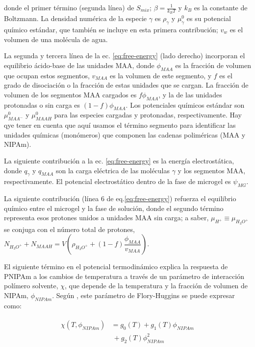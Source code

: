 \noindent donde el primer t\'ermino (segunda l\'inea) de $S_{mix}$; $\beta=\frac{1}{k_BT}$ y $k_B$ es la constante de Boltzmann.
La densidad num\'erica de la especie $\gamma$ es $\rho_\gamma$ y $\mu^0_\gamma$ es su potencial qu\'imico est\'andar, que tambi\'en se incluye en esta primera contribución; $v_w$ es el volumen de una mol\'ecula de agua.


La segunda y tercera l\'inea de la ec. \ref{eq:free-energy} (lado derecho) incorporan el equilibrio \'acido-base de las unidades MAA, donde $\phi_{MAA}$ es la fracci\'on de volumen que ocupan estos segmentos, $v_{MAA}$ es la volumen de este segmento, y $f$ es el grado de disociaci\'on o la fracci\'on de estas unidades que se cargan.
La fracci\'on de volumen de los segmentos MAA cargados es $f\phi_{MAA}$, y la de las unidades protonadas o sin carga es $(1-f)\phi_{MAA}$.
Los potenciales qu\'imicos est\'andar son $\mu^0_{MAA^-}$ y $\mu^0_{MAAH}$ para las especies cargadas y protonadas, respectivamente.
Hay qye tener en cuenta que aqu\'i usamos el t\'ermino segmento para identificar las unidades qu\'imicas (monómeros) que componen las cadenas polim\'ericas (MAA y NIPAm).


La siguiente contribuci\'on a la ec. \ref{eq:free-energy} es la energ\'ia electrost\'atica, donde $q_\gamma$ y $q_{MAA}$ son la carga el\'ectrica de las moléculas $\gamma$ y los segmentos MAA, respectivamente.
El potencial electrost\'atico dentro de la fase de microgel es $\psi_{MG}$.


La siguiente contribución (l\'inea 6 de eq.\ref{eq:free-energy}) refuerza el equilibrio qu\'imico entre el microgel y la fase de soluci\'on, donde el segundo t\'ermino representa esos protones unidos a unidades MAA sin carga;
a saber, $\mu_{H^+}\equiv\mu_{H_3O^+}$ se conjuga con el n\'umero total de protones,
$N_{H_3O^+}+N_{MAAH}=V\left(\rho_{H_3O^+}+(1-f)\dfrac{\phi_{MAA}}{v_{MAA}}\right)$.


El siguiente t\'ermino en el potencial termodin\'amico explica la respuesta de PNIPAm a los cambios de temperatura a trav\'es de un par\'ametro de interacci\'on pol\'imero solvente, $\chi$, que depende de la temperatura y la fracci\'on de volumen de NIPAm, $\phi_{NIPAm}$.
Seg\'un \addcite[afroze2000], este par\'ametro de Flory-Huggins se puede expresar como:
%
%


\begin{align}
\begin{aligned}
\chi (T, \phi_{NIPAm}) &=g_0(T) +g_1(T)\phi_{NIPAm} \\
 &~+ g_2(T)\phi_{NIPAm}^2
\end{aligned}
\end{align}


